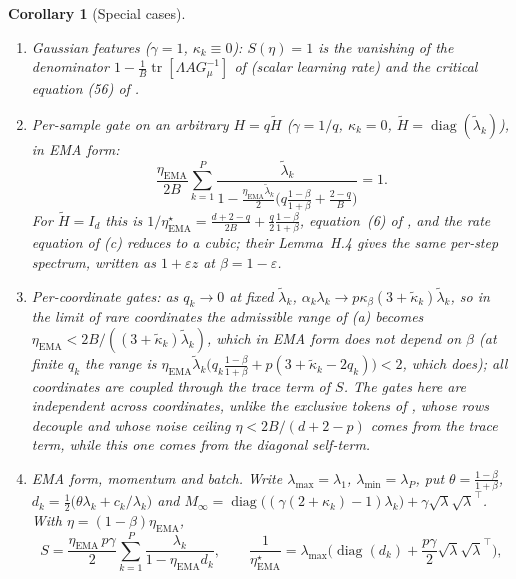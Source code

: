 \documentclass[11pt]{article}
\newtheorem{corollary}[theorem]{Corollary}
\theoremstyle{remark}
\newcommand{\tr}{\operatorname{tr}}
\begin{document}
\begin{corollary}[Special cases]\label{cor:special}
\begin{enumerate}
\item[(i)] Gaussian features ($\gamma=1$, $\kappa_k\equiv0$): $S(\eta)=1$ is the vanishing of the denominator $1-\frac1B\tr[\Lambda AG_\mu^{-1}]$ of \citet[Theorem~2]{ziyin2022strength} (scalar learning rate) and the critical equation (56) of \citet{wang2026momentum}.
\item[(ii)] Per-sample gate on an arbitrary $H=q\tilde H$ ($\gamma=1/q$, $\kappa_k=0$, $\tilde H=\operatorname{diag}(\tilde\lambda_k)$), in EMA form:
\[
\frac{\eta_{\mathrm{EMA}}}{2B}\sum_{k=1}^P\frac{\tilde\lambda_k}{1-\frac{\eta_{\mathrm{EMA}}\tilde\lambda_k}{2}\Big(q\frac{1-\beta}{1+\beta}+\frac{2-q}{B}\Big)}=1 .
\]
For $\tilde H=I_d$ this is $1/\eta_{\mathrm{EMA}}^\star=\frac{d+2-q}{2B}+\frac q2\frac{1-\beta}{1+\beta}$, equation~(6) of \citet{everett2026sparse}, and the rate equation of (c) reduces to a cubic; their Lemma~H.4 gives the same per-step spectrum, written as $1+\varepsilon z$ at $\beta=1-\varepsilon$.
\item[(iii)] Per-coordinate gates: as $q_k\to0$ at fixed $\tilde\lambda_k$, $\alpha_k\lambda_k\to p\kappa_\beta(3+\tilde\kappa_k)\tilde\lambda_k$, so in the limit of rare coordinates the admissible range of (a) becomes $\eta_{\mathrm{EMA}}<2B/((3+\tilde\kappa_k)\tilde\lambda_k)$, which in EMA form does not depend on $\beta$ (at finite $q_k$ the range is $\eta_{\mathrm{EMA}}\tilde\lambda_k\big(q_k\frac{1-\beta}{1+\beta}+p(3+\tilde\kappa_k-2q_k)\big)<2$, which does); all coordinates are coupled through the trace term of $S$. The gates here are independent across coordinates, unlike the exclusive tokens of \citet{everett2026sparse}, whose rows decouple and whose noise ceiling $\eta<2B/(d+2-p)$ \citep[Section~4.2]{everett2026sparse} comes from the trace term, while this one comes from the diagonal self-term.
\item[(iv)] EMA form, momentum and batch. Write $\lambda_{\max}=\lambda_1$, $\lambda_{\min}=\lambda_P$, put $\theta=\frac{1-\beta}{1+\beta}$, $d_k=\frac12\big(\theta\lambda_k+c_k/\lambda_k\big)$ and $M_\infty=\operatorname{diag}\big((\gamma(2+\kappa_k)-1)\lambda_k\big)+\gamma\sqrt\lambda\sqrt\lambda^\top$. With $\eta=(1-\beta)\eta_{\mathrm{EMA}}$,
\[
S=\frac{\eta_{\mathrm{EMA}}\,p\gamma}{2}\sum_{k=1}^P\frac{\lambda_k}{1-\eta_{\mathrm{EMA}}d_k},\qquad \frac1{\eta^\star_{\mathrm{EMA}}}=\lambda_{\max}\Big(\operatorname{diag}(d_k)+\frac{p\gamma}{2}\sqrt\lambda\sqrt\lambda^\top\Big),
\]
\end{enumerate}
\end{corollary}
\end{document}
